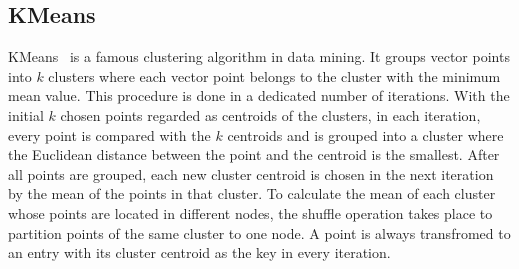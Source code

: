 \documentclass[10pt,journal,compsoc]{IEEEtran}
\newcommand{\red}[1]{\textcolor{red}{#1}}
\begin{document}

\subsection{KMeans}
KMeans~\cite{kmeans} is a famous clustering algorithm in data mining.
It groups vector points into $k$ clusters where each vector point belongs to the cluster with the minimum mean value. 
This procedure is done in a dedicated number of iterations. 
With the initial $k$ chosen points regarded as centroids of the clusters, 
in each iteration, every point is compared with the $k$ centroids and is grouped into a cluster where the Euclidean distance between the point and the centroid is the smallest. 
After all points are grouped, each new cluster centroid is chosen in the next iteration by the mean of the points in that cluster. 
To calculate the mean of each cluster whose points are located in different nodes, the shuffle operation takes place to partition points of the same cluster to one node. 
A point is always transfromed to an entry with its cluster centroid as the key in every iteration. 

\end{document}
